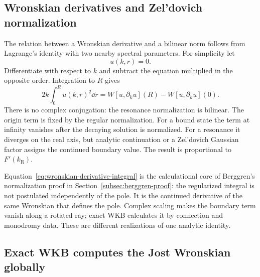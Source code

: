 \subsection{Wronskian derivatives and Zel'dovich normalization}
\label{subsec:wronskian-derivative-normalization}

The relation between a Wronskian derivative and a bilinear norm follows from
Lagrange's identity with two nearby spectral parameters.  For simplicity let
\begin{equation}
  [-\partial_r^2+U(r)-k^2]u(k,r)=0.
  \label{eq:parameter-dependent-radial}
\end{equation}
Differentiate with respect to $k$ and subtract the equation multiplied in the
opposite order.  Integration to $R$ gives
\begin{equation}
  2k\int_0^R u(k,r)^2\dd r
  =W[u,\partial_k u](R)-W[u,\partial_k u](0).
  \label{eq:wronskian-derivative-integral}
\end{equation}
There is no complex conjugation: the resonance normalization is bilinear.
The origin term is fixed by the regular normalization.  For a bound state the
term at infinity vanishes after the decaying solution is normalized.  For a
resonance it diverges on the real axis, but analytic continuation or a
Zel'dovich Gaussian factor assigns the continued boundary value.  The result
is proportional to $F'(k_{\mathrm R})$.

Equation~\eqref{eq:wronskian-derivative-integral} is the calculational core of
Berggren's normalization proof in Section~\ref{subsec:berggren-proof}: the
regularized integral is not postulated independently of the pole.  It is the
continued derivative of the same Wronskian that defines the pole.  Complex
scaling makes the boundary term vanish along a rotated ray; exact WKB
calculates it by connection and monodromy data.  These are different
realizations of one analytic identity.

\subsection{Exact WKB computes the Jost Wronskian globally}
\label{subsec:sl-jost-exact-wkb}

